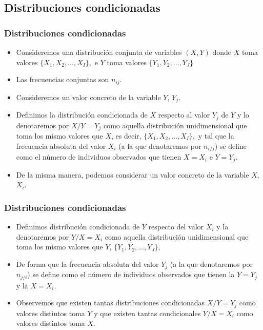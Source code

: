 \subsection{Distribuciones condicionadas}

\begin{frame}
\frametitle{Distribuciones condicionadas}
\begin{itemize}
\item Consideremos una distribución conjunta de variables $(X,Y)$ donde $X$ toma valores $\{X_1,X_2,\ldots,X_I\},
$ e $Y$ toma valores $\{Y_1,Y_2,\ldots,Y_J\}$
\item Las frecuencias conjuntas son    $n_{ij}$.
\item Consideremos un valor concreto de la variable $Y$, $Y_j$. 
\item Definimos la distribución
condicionada de $X$ respecto al valor $Y_j$ de    $Y$  y lo denotaremos por $X/Y=Y_j$ como aquella distribución unidimensional que toma los mismo valores  que $X$, es decir, $\{X_1,X_2,\ldots,X_I\},$ y tal que la frecuencia absoluta del valor $X_i$ (a la que denotaremos por $n_{i/j}$) se define como el número de individuos observados que tienen $X=X_i$ e $Y=Y_j$.
\item De la misma manera, podemos considerar un valor concreto de la variable $X$, $X_i$.
\end{itemize}
\end{frame}



\begin{frame}
\frametitle{Distribuciones condicionadas}
\begin{itemize}
\item  Definimos distribución condicionada de $Y$ respecto del valor  $X_i$  y la denotaremos por $Y/X=X_i$ como aquella
distribución unidimensional que toma los mismo valores que $Y$, $\{Y_1,Y_2,\ldots,Y_J\},$
\item De forma que la frecuencia absoluta del valor $Y_j$ (a la que denotaremos por  $n_{j/i}$) se
define como el número de individuos observados que tienen la  $Y=Y_j$ y la $X=X_i$.
\item Observemos que existen tantas distribuciones condicionadas $X/Y=Y_j$ como valores
distintos toma $Y$ y  que existen tantas condicionales  $Y/X=X_i$ como valores distintos
toma $X$.
\end{itemize}
\end{frame}

